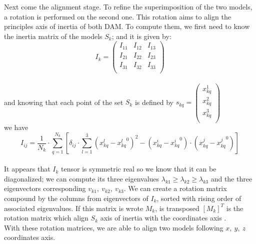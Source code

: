 \documentclass[a4paper, 11pt]{report}
\begin{document}
Next come the alignment stage. 
To refine the superimposition of the two models, a rotation is 
performed on the second one. 
This rotation aims to align the principles axis of inertia of both 
DAM. 
To compute them, we first need to know the inertia matrix of the 
models $S_{k}$; and it is given by:
\[
I_{k}=
\begin{pmatrix}
 I_{11} & I_{12} & I_{13} \\
 I_{21} & I_{22} & I_{23} \\
 I_{31} & I_{32} & I_{33} \\
\end{pmatrix}
\]\\
and knowing that each point of the set $S_{k}$ is defined by
$
s_{kq}=
\begin{pmatrix}
 x_{kq}^1 \\
 x_{kq}^2 \\
 x_{kq}^3 \\
\end{pmatrix}
$\\
we have
\[
I_{ij} = \frac{1}{N_{k}} \cdot \sum\limits_{q=1}^{N_{k}} 
[\delta_{ij} \cdot \sum\limits_{l=1}^3 
 (x_{kq}^l - {x_{kq}^l}^0)^2 -  (x_{kq}^i - {x_{kq}^i}^0) 
 \cdot (x_{kq}^j - {x_{kq}^j}^0)]
\]\\
It appears that $I_{k}$ tensor is symmetric real so we know that it 
can be diagonalized; we can compute its three eigenvalues 
$\lambda_{k1} \geq \lambda_{k2} \geq \lambda_{k3}$ and the three 
eigenvectors corresponding $v_{k1},\ v_{k2},\ v_{k3}$. 
We can create a rotation matrix compound by the columns from 
eigenvectors of $I_{k}$, sorted with rising order of associated 
eigenvalues. 
If this matrix is wrote $M_{k}$, is transposed $[M_{k}]^T$ is the 
rotation matrix which align $S_{k}$ axis of inertia with the 
coordinates axis \cite{supcomb}.\\
With these rotation matrices, we are able to align two models 
following $x,\ y,\ z$ coordinates axis.\\
\end{document}
